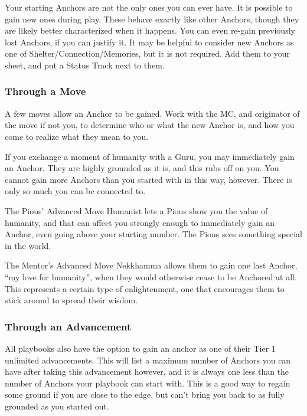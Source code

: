 \documentclass[
]{memoir}
\begin{document}
Your starting Anchors are not the only ones you can ever have. It is
possible to gain new ones during play. These behave exactly like other
Anchors, though they are likely better characterized when it happens.
You can even re-gain previously lost Anchors, if you can justify it. It
may be helpful to consider new Anchors as one of
Shelter/Connection/Memories, but it is not required. Add them to your
sheet, and put a Status Track next to them.

\hypertarget{through-a-move}{%
\subsubsection{Through a Move}\label{through-a-move}}

A few moves allow an Anchor to be gained. Work with the MC, and
originator of the move if not you, to determine who or what the new
Anchor is, and how you come to realize what they mean to you.

If you exchange a moment of humanity with a Guru, you may immediately
gain an Anchor. They are highly grounded as it is, and this rubs off on
you. You cannot gain more Anchors than you started with in this way,
however. There is only so much you can be connected to.

The Pious' Advanced Move Humanist lets a Pious show you the value of
humanity, and that can affect you strongly enough to immediately gain an
Anchor, even going above your starting number. The Pious sees something
special in the world.

The Mentor's Advanced Move Nekkhamma allows them to gain one last
Anchor, ``my love for humanity'', when they would otherwise cease to be
Anchored at all. This represents a certain type of enlightenment, one
that encourages them to stick around to spread their wisdom.

\hypertarget{through-an-advancement}{%
\subsubsection{Through an Advancement}\label{through-an-advancement}}

All playbooks also have the option to gain an anchor as one of their
Tier 1 unlimited advancements. This will list a maximum number of
Anchors you can have after taking this advancement however, and it is
always one less than the number of Anchors your playbook can start with.
This is a good way to regain some ground if you are close to the edge,
but can't bring you back to as fully grounded as you started out.
\end{document}
